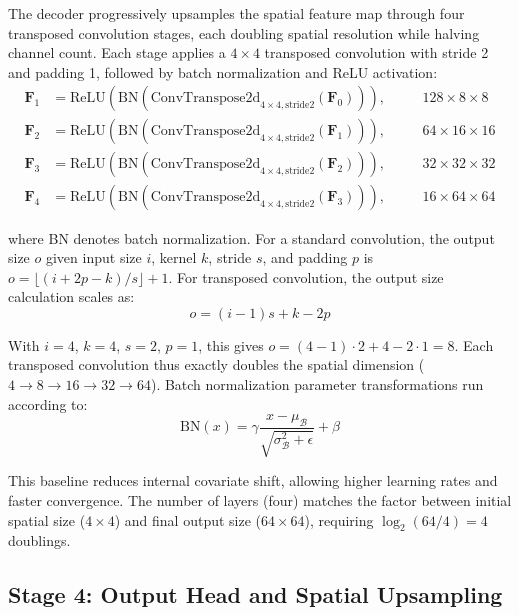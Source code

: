 \documentclass[12pt,a4paper,oneside]{report}
\begin{document}
The decoder progressively upsamples the spatial feature map through four transposed convolution stages, each doubling spatial resolution while halving channel count. Each stage applies a $4 \times 4$ transposed convolution with stride 2 and padding 1, followed by batch normalization and ReLU activation:
\begin{align}
\mathbf{F}_1 &= \text{ReLU}(\text{BN}(\text{ConvTranspose2d}_{4\times4,\text{stride}2}(\mathbf{F}_0))), &\quad &128 \times 8 \times 8 \\
\mathbf{F}_2 &= \text{ReLU}(\text{BN}(\text{ConvTranspose2d}_{4\times4,\text{stride}2}(\mathbf{F}_1))), &\quad &64 \times 16 \times 16 \\
\mathbf{F}_3 &= \text{ReLU}(\text{BN}(\text{ConvTranspose2d}_{4\times4,\text{stride}2}(\mathbf{F}_2))), &\quad &32 \times 32 \times 32 \\
\mathbf{F}_4 &= \text{ReLU}(\text{BN}(\text{ConvTranspose2d}_{4\times4,\text{stride}2}(\mathbf{F}_3))), &\quad &16 \times 64 \times 64
\end{align}

where BN denotes batch normalization. For a standard convolution, the output size $o$ given input size $i$, kernel $k$, stride $s$, and padding $p$ is $o = \lfloor (i + 2p - k)/s \rfloor + 1$. For transposed convolution, the output size calculation scales as:
\begin{equation}o = (i - 1)s + k - 2p
\end{equation}

With $i=4$, $k=4$, $s=2$, $p=1$, this gives $o = (4 - 1)\cdot 2 + 4 - 2\cdot 1 = 8$. Each transposed convolution thus exactly doubles the spatial dimension ($4 \rightarrow 8 \rightarrow 16 \rightarrow 32 \rightarrow 64$). Batch normalization parameter transformations run according to:
\begin{equation}\text{BN}(x) = \gamma \frac{x - \mu_{\mathcal{B}}}{\sqrt{\sigma_{\mathcal{B}}^2 + \epsilon}} + \beta
\end{equation}

This baseline reduces internal covariate shift, allowing higher learning rates and faster convergence. The number of layers (four) matches the factor between initial spatial size ($4 \times 4$) and final output size ($64 \times 64$), requiring $\log_2(64/4) = 4$ doublings.
\subsection{Stage 4: Output Head and Spatial Upsampling}
\label{subsec:stage_4_output_head_and_spatial_upsampling}
\end{document}
